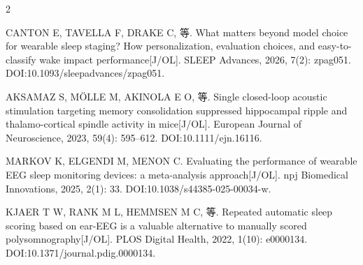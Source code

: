 \documentclass[UTF8,zihao=5,fontset=none]{ctexart}
\begin{document}
\begin{multicols}{2}
{\makebox[25.2pt][l]{[75]}CANTON E, TAVELLA F, DRAKE C, 等. What matters beyond model choice for wearable sleep staging? How personalization, evaluation choices, and easy-to-classify wake impact performance[J/OL]. SLEEP Advances, 2026, 7(2): zpag051. DOI:10.1093/sleepadvances/zpag051.\par
\makebox[25.2pt][l]{[76]}AKSAMAZ S, MÖLLE M, AKINOLA E O, 等. Single closed-loop acoustic stimulation targeting memory consolidation suppressed hippocampal ripple and thalamo-cortical spindle activity in mice[J/OL]. European Journal of Neuroscience, 2023, 59(4): 595--612. DOI:10.1111/ejn.16116.\par
\makebox[25.2pt][l]{[77]}MARKOV K, ELGENDI M, MENON C. Evaluating the performance of wearable EEG sleep monitoring devices: a meta-analysis approach[J/OL]. npj Biomedical Innovations, 2025, 2(1): 33. DOI:10.1038/s44385-025-00034-w.\par
\makebox[25.2pt][l]{[78]}KJAER T W, RANK M L, HEMMSEN M C, 等. Repeated automatic sleep scoring based on ear-EEG is a valuable alternative to manually scored polysomnography[J/OL]. PLOS Digital Health, 2022, 1(10): e0000134. DOI:10.1371/journal.pdig.0000134.\par
}
\end{multicols}
\end{document}
